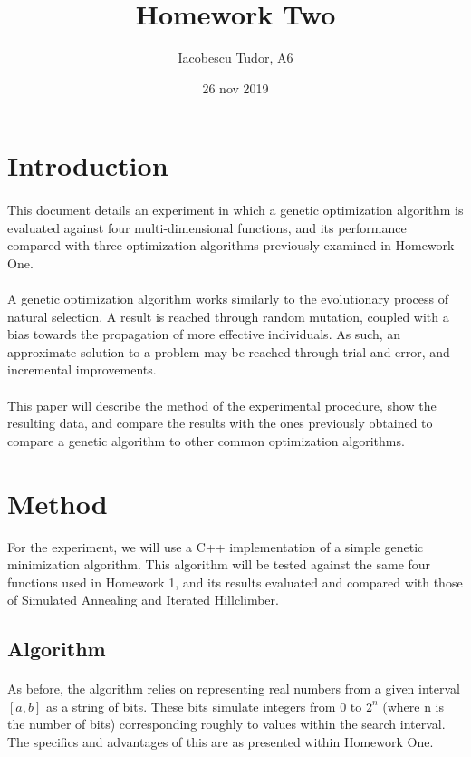 \documentclass{article}
\title{Homework Two}
\date{26 nov 2019}
\author{Iacobescu Tudor, A6}
\begin{document}
	\maketitle
	
    \section{Introduction}
    \paragraph{}
    This document details an experiment in which a genetic optimization algorithm is evaluated against four multi-dimensional functions, and its performance compared with three optimization algorithms previously examined in   Homework One. 
    \paragraph{}
    A genetic optimization algorithm works similarly to the evolutionary process of natural selection. A result is reached through random mutation, coupled with a bias towards the propagation of more effective individuals. As such, an approximate solution to a problem may be reached through trial and error, and incremental improvements.
    \paragraph{}
    This paper will describe the method of the experimental procedure, show the resulting data, and compare the results with the ones previously obtained to compare a genetic algorithm to other common optimization algorithms.

	\section{Method}
    For the experiment, we will use a C++ implementation of a simple genetic minimization algorithm. This algorithm will be tested against the same four functions used in Homework 1, and its results evaluated and compared with those of Simulated Annealing and Iterated Hillclimber.

    \subsection{Algorithm}
    \paragraph{}
    As before, the algorithm relies on representing real numbers from a given interval \([a, b]\) as a string of bits. These bits simulate integers from 0 to \(2^n\) (where n is the number of bits) corresponding roughly to values within the search interval. The specifics and advantages of this are as presented within Homework One.
\end{document}
